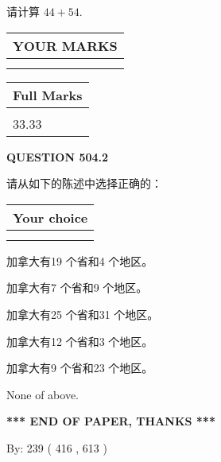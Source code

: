 \documentclass{ctexart}
\begin{document}
  
 
请计算 $ %
44 +  %
54 $.
 

 

 
  
\vspace{0.2in}
  
\noindent\begin{tabular}{|l|}
\hline
 YOUR MARKS  \\
\hline
 \\ 
 \\ 
\hline
\end{tabular}
\hspace{0.05in} \begin{tabular}{|l|}
\hline
 Full Marks  \\
\hline
 \\ 
33.33 \\
\hline
\end{tabular}
{\textbf{\Large{QUESTION
504.2 
}}}
  
  
请从如下的陈述中选择正确的：
  
  
\noindent\hspace{3.0in} \begin{tabular}{|l|}
\hline
Your choice \\
\hline
 \\ 
 \\ 
\hline
\end{tabular}
  
  
 
 
加拿大有19 个省和4 个地区。
 
 
加拿大有7 个省和9 个地区。
 
 
加拿大有25 个省和31 个地区。
 
 
加拿大有12 个省和3 个地区。
 
 
加拿大有9 个省和23 个地区。
 
 
 None of above.
 
 
   
   
 \vspace{0.2in}
 
   
   
   
   
\vspace{1.0in} 
{\textbf{\large{ *** END OF PAPER, THANKS *** }}} 
   
   
\hspace{1.0in} By: 
 239 ( 416 ,  613 )
   
\end{document}
